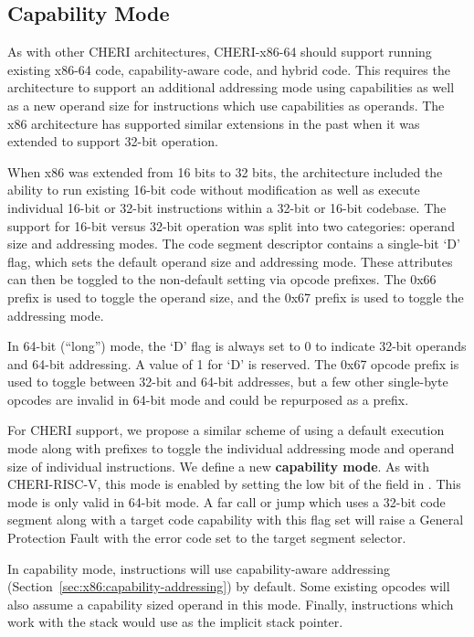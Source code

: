 \subsection{Capability Mode}

As with other CHERI architectures, CHERI-x86-64 should support running existing
x86-64 code, capability-aware code, and hybrid code.  This
requires the architecture to support an additional addressing mode
using capabilities as well as a new operand size for instructions
which use capabilities as operands.
The x86 architecture has supported similar extensions in the past when it was
extended to support 32-bit operation.

When x86 was extended from 16 bits to 32 bits, the architecture
included the ability to run existing 16-bit code without modification
as well as execute individual 16-bit or 32-bit instructions within a
32-bit or 16-bit codebase.  The support for 16-bit versus 32-bit
operation was
split into two categories: operand size and addressing modes.  The
code segment descriptor contains a single-bit `D' flag, which sets the
default operand size and addressing mode.  These attributes can then
be toggled to the non-default setting via opcode prefixes.  The 0x66
prefix is used to toggle the operand size, and the 0x67 prefix is used
to toggle the addressing mode.

In 64-bit (``long'') mode, the `D' flag is always set to
0 to indicate 32-bit operands and 64-bit addressing.  A value of
1 for `D' is reserved.  The 0x67 opcode prefix is used to toggle
between 32-bit and 64-bit addresses, but a few other single-byte opcodes
are invalid in 64-bit mode and could be repurposed as a prefix.

For CHERI support, we propose a similar scheme of using a default
execution mode along with prefixes to toggle the individual addressing
mode and operand size of individual instructions.  We define a new
\textbf{capability mode}.  As with CHERI-RISC-V, this mode is enabled
by setting the low bit of the \cflags{} field in \CIP{}.  This mode is
only valid in 64-bit mode.  A far call or jump which uses a 32-bit
code segment along with a target code capability with this flag set
will raise a General Protection Fault with the error code set to the
target segment selector.

In capability mode, instructions will use capability-aware addressing
(Section~\ref{sec:x86:capability-addressing}) by default.  Some existing
opcodes will also assume a capability sized operand in this mode.
Finally, instructions which work with the stack would use \CSP{} as
the implicit stack pointer.

